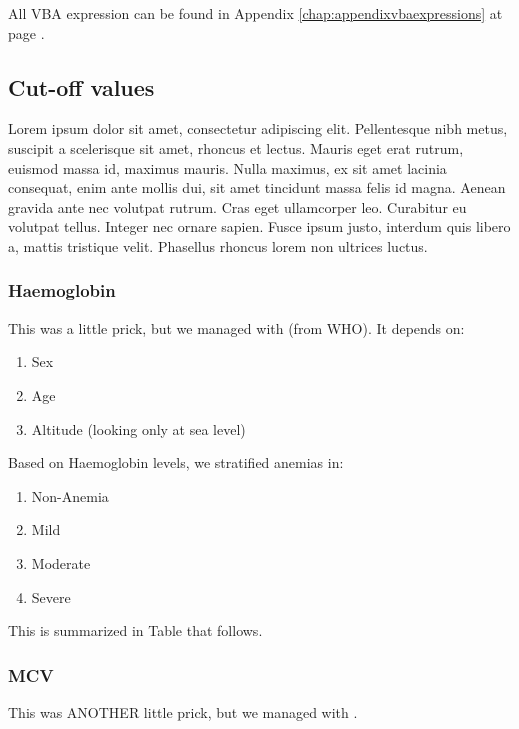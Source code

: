 All VBA expression can be found in Appendix \ref{chap:appendixvbaexpressions} at page \pageref{chap:appendixvbaexpressions}.


\subsection{Cut-off values}\label{sub:cutoffvalues}
Lorem ipsum dolor sit amet, consectetur adipiscing elit. Pellentesque nibh metus, suscipit a scelerisque sit amet, rhoncus et lectus. Mauris eget erat rutrum, euismod massa id, maximus mauris. Nulla maximus, ex sit amet lacinia consequat, enim ante mollis dui, sit amet tincidunt massa felis id magna. Aenean gravida ante nec volutpat rutrum. Cras eget ullamcorper leo. Curabitur eu volutpat tellus. Integer nec ornare sapien. Fusce ipsum justo, interdum quis libero a, mattis tristique velit. Phasellus rhoncus lorem non ultrices luctus.


\subsubsection{Haemoglobin}\label{sub:haemoglobin}
This was a little prick, but we managed with \cite{Hbcutoff} (from WHO).
It depends on:
\begin{enumerate}
	\item Sex
	\item Age
	\item Altitude (looking only at sea level)
\end{enumerate}
Based on Haemoglobin levels, we stratified anemias in:
\begin{enumerate}
	\item Non-Anemia
	\item Mild
	\item Moderate
	\item Severe
\end{enumerate}
This is summarized in Table that follows.


\subsubsection{MCV}\label{sub:mcv}
This was ANOTHER little prick, but we managed with \cite{MCVferritincutoff}.

